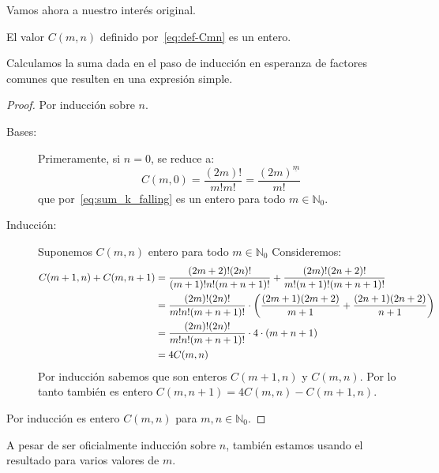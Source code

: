   Vamos ahora a nuestro interés original.
  \begin{proposition}
    El valor \(C(m, n)\) definido por~\eqref{eq:def-Cmn}
    es un entero.
  \end{proposition}
  Calculamos la suma dada en el paso de inducción
  en esperanza de factores comunes
  que resulten en una expresión simple.
  \begin{proof}
    Por inducción sobre \(n\).
    \begin{description}
    \item[Bases:]
      Primeramente,
      si \(n = 0\),
      se reduce a:
      \begin{equation}
	\label{eq:Cm0}
	C(m, 0)
	  = \frac{(2 m)!}{m! m!}
	  = \frac{(2 m)^{\underline{m}}}{m!}
      \end{equation}
      que por~\eqref{eq:sum_k_falling} es un entero
      para todo \(m \in \mathbb{N}_0\).
    \item[Inducción:]
      Suponemos \(C(m, n)\) entero para todo \(m \in \mathbb{N}_0\)
      Consideremos:
      \begin{align}
	C(m + 1, n) + C(m, n + 1)
	  &= \frac{(2 m + 2)! (2 n)!}{(m + 1)! n! (m + n + 1)!}
	       + \frac{(2 m)! (2 n + 2)!}{m! (n + 1)! (m + n + 1)!}
		\notag \\
	  &= \frac{(2 m)! (2 n)!}{m! n! (m + n + 1)!}
	       \cdot \left(
		       \frac{(2 m + 1) (2 m + 2)}{m + 1}
			 + \frac{(2 n + 1) (2 n + 2)}{n + 1}
		     \right) \notag \\
	  &= \frac{(2 m)! (2 n)!}{m! n! (m + n + 1)!}
	       \cdot 4 \cdot (m + n + 1) \notag \\
	  &= 4 C(m, n) \label{eq:4Cmn}
      \end{align}
      Por inducción
      sabemos que son enteros \(C(m + 1, n)\) y \(C(m, n)\).
      Por lo tanto
      también es entero
      \(C(m, n + 1) = 4 C(m, n) - C(m + 1, n)\).
    \end{description}
    Por inducción es entero \(C(m, n)\)
    para \(m, n \in \mathbb{N}_0\).
  \end{proof}
  A pesar de ser oficialmente inducción sobre \(n\),
  también estamos usando el resultado para varios valores de \(m\).

